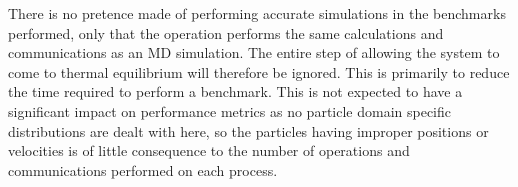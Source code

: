 %
There is no pretence made of performing accurate simulations in
the benchmarks performed,
only that the operation performs the same calculations and
communications as an MD simulation.
%
The entire step of allowing the system to come to
thermal equilibrium will therefore be ignored.
%
This is primarily to reduce the time required to perform a benchmark.
%
This is not expected to have a significant impact on performance metrics
as no particle domain specific distributions are dealt with here,
so the particles having improper positions or velocities is of
little consequence to the number of operations and communications
performed on each process.
